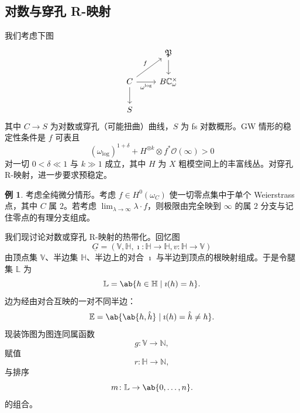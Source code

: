 \documentclass{amsart}
\theoremstyle{definition}
\newtheorem{exm}[thm]{例}
\theoremstyle{remark}
\theoremstyle{plain}
\theoremstyle{definition}
\theoremstyle{remark}
\newcommand{\N}{\mathbb{N}}
\newcommand{\C}{\mathbb{C}}
\newcommand{\E}{\mathbb{E}}
\newcommand{\V}{\mathbb{V}}
\renewcommand{\H}{\mathbb{H}}
\renewcommand{\L}{\mathbb{L}}
\newcommand{\mc}[1]{\mathcal{#1}}
\newcommand{\mf}[1]{\mathfrak{#1}}
\newcommand{\ul}[1]{\underline{#1}}
\newcommand{\1}{\mathbf{1}}
\newcommand{\2}{\mathbf{2}}
\newcommand{\3}{\mathbf{3}}
\begin{document}
\subsection{对数与穿孔 R-映射}%
\label{sub:Log and punctured R-maps}

我们考虑下图
\begin{equation*}
\begin{tikzcd}
    & \mf{P} \ar{d} \\
    C \ar{ur}{f} \ar{r}[swap]{\omega^{\log}} \ar{d} & B \C_{\omega}^{\times} \\
    S
\end{tikzcd}
\end{equation*}
其中 \(C \to S\) 为对数或穿孔（可能扭曲）曲线，\(S\) 为 fs 对数概形。GW 情形的稳定性条件是 \(f\) 可表且
\[ (\omega_{\log})^{1+\delta} + H^{\otimes k} \otimes f^* \mc{O}(\infty) > 0 \]
对一切 \(0 < \delta \ll 1\) 与 \(k \gg 1\) 成立，其中 \(H\) 为 \(X\) 粗模空间上的丰富线丛。对穿孔 R-映射，进一步要求预稳定。

\begin{exm}
    考虑全纯微分情形。考虑 \(f \in H^0(\omega_C)\) 使一切零点集中于单个 Weierstrass 点，其中 \(C\) 属 \(2\)。若考虑 \(\lim_{\lambda \to \infty} \lambda \cdot f\)，则极限由完全映到 \(\infty\) 的属 \(2\) 分支与记住零点的有理分支组成。
\end{exm}

我们现讨论对数或穿孔 R-映射的热带化。回忆图
\[ \ul{G} = (\V, \H, \imath \colon \H \to \H, v \colon \H \to \V) \]
由顶点集 \(\V\)、半边集 \(\H\)、半边上的对合 \(\imath\) 与半边到顶点的根映射组成。于是令腿集 \(\L\) 为
\[ \L = \ab\{ h \in \H \mid \imath(h) = h\}. \]
边为经由对合互映的一对不同半边：
\[ \E = \ab\{ \ab\{h, \hat{h}\} \mid \imath(h) = \hat{h} \neq h \}. \]
现装饰图为图连同属函数
\[ g \colon \V \to \N, \]
赋值
\[ r \colon \H \to \N, \]
与排序
\[ m \colon \L \to \ab\{0, \ldots, n\}. \]
的组合。
\end{document}
